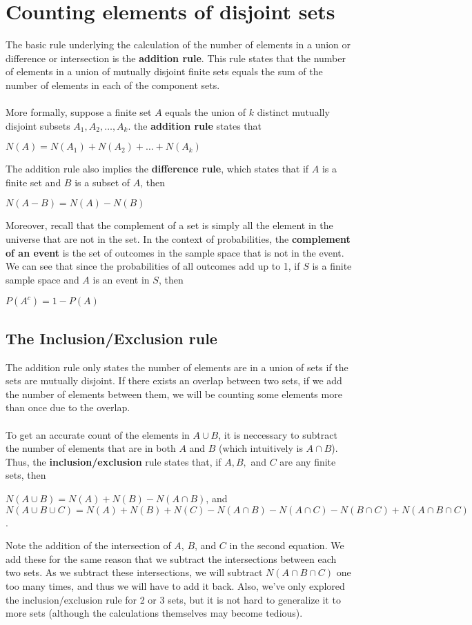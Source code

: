 \documentclass[a4paper]{article}
\begin{document}
\section{Counting elements of disjoint sets}
The basic rule underlying the calculation of the number of elements in a union or difference or intersection is the \textbf{addition rule}. This rule states that the number of elements in a union of mutually disjoint finite sets equals the sum of the number of elements in each of the component sets.\\ \\
More formally, suppose a finite set $A$ equals the union of $k$ distinct mutually disjoint subsets $A_1, A_2, \dots, A_k$. the \textbf{addition rule} states that
\begin{center}
	$N(A) = N(A_1) + N(A_2) + \dots + N(A_k)$
\end{center}
The addition rule also implies the \textbf{difference rule}, which states that if $A$ is a finite set and $B$ is a subset of $A$, then
\begin{center}
	$N(A-B) = N(A) - N(B)$
\end{center}
Moreover, recall that the complement of a set is simply all the element in the universe that are not in the set. In the context of probabilities, the \textbf{complement of an event} is the set of outcomes in the sample space that is not in the event. We can see that since the probabilities of all outcomes add up to 1, if $S$ is a finite sample space and $A$ is an event in $S$, then 
\begin{center}
	$P(A^c) = 1 - P(A)$
\end{center}

\subsection{The Inclusion/Exclusion rule}
The addition rule only states the number of elements are in a union of sets if the sets are mutually disjoint. If there exists an overlap between two sets, if we add the number of elements between them, we will be counting some elements more than once due to the overlap.\\ \\
To get an accurate count of the elements in $A\cup B$, it is neccessary to subtract the number of elements that are in both $A$ and $B$ (which intuitively is $A\cap B$). Thus, the \textbf{inclusion/exclusion} rule states that, if $A, B,$ and $C$ are any finite sets, then
\begin{center}
	$N(A\cup B) = N(A) + N(B) - N(A\cap B)$, and\\
	$N(A\cup B\cup C) = N(A) + N(B) + N(C) - N(A\cap B) - N(A\cap C) - N(B\cap C) + N(A\cap B \cap C)$.
\end{center}
Note the addition of the intersection of $A$, $B$, and $C$ in the second equation. We add these for the same reason that we subtract the intersections between each two sets. As we subtract these intersections, we will subtract $N(A\cap B\cap C)$ one too many times, and thus we will have to add it back. Also, we've only explored the inclusion/exclusion rule for 2 or 3 sets, but it is not hard to generalize it to more sets (although the calculations themselves may become tedious).
\end{document}
